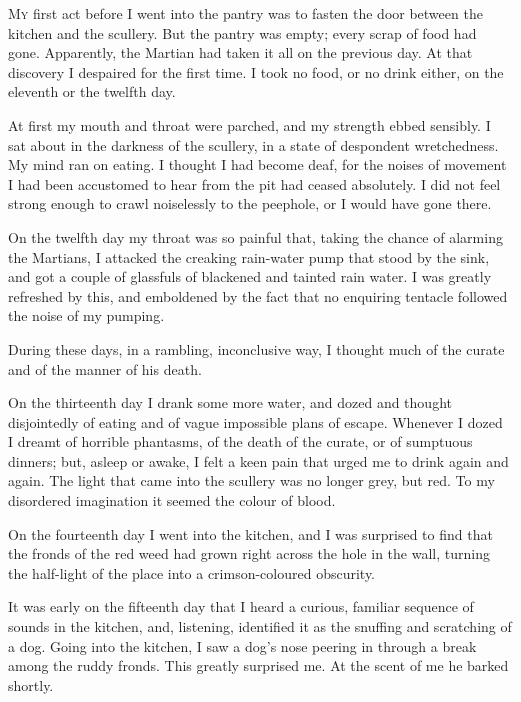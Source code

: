 

\lettrine[lines=4]{M}{y} first act before I went into the pantry was to fasten the door between the kitchen and the scullery. But the pantry was empty; every scrap of food had gone. Apparently, the Martian had taken it all on the previous day. At that discovery I despaired for the first time. I took no food, or no drink either, on the eleventh or the twelfth day.

At first my mouth and throat were parched, and my strength ebbed sensibly. I sat about in the darkness of the scullery, in a state of despondent wretchedness. My mind ran on eating. I thought I had become deaf, for the noises of movement I had been accustomed to hear from the pit had ceased absolutely. I did not feel strong enough to crawl noiselessly to the peephole, or I would have gone there.

On the twelfth day my throat was so painful that, taking the chance of alarming the Martians, I attacked the creaking rain-water pump that stood by the sink, and got a couple of glassfuls of blackened and tainted rain water. I was greatly refreshed by this, and emboldened by the fact that no enquiring tentacle followed the noise of my pumping.

During these days, in a rambling, inconclusive way, I thought much of the curate and of the manner of his death.

On the thirteenth day I drank some more water, and dozed and thought disjointedly of eating and of vague impossible plans of escape. Whenever I dozed I dreamt of horrible phantasms, of the death of the curate, or of sumptuous dinners; but, asleep or awake, I felt a keen pain that urged me to drink again and again. The light that came into the scullery was no longer grey, but red. To my disordered imagination it seemed the colour of blood.

On the fourteenth day I went into the kitchen, and I was surprised to find that the fronds of the red weed had grown right across the hole in the wall, turning the half-light of the place into a crimson-coloured obscurity.

It was early on the fifteenth day that I heard a curious, familiar sequence of sounds in the kitchen, and, listening, identified it as the snuffing and scratching of a dog. Going into the kitchen, I saw a dog's nose peering in through a break among the ruddy fronds. This greatly surprised me. At the scent of me he barked shortly.

